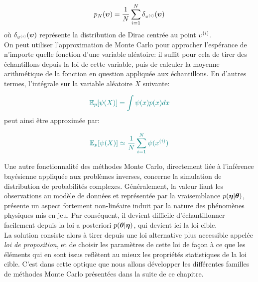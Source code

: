 \begin{equation}
p_N({\bm{\upsilon}}) = \dfrac{1}{N} \sum\limits_{i=1}^N\delta_{{\upsilon}^{(i)}}({\bm{\upsilon}})
\label{eq_approximation_MC}
\end{equation}
où $\delta_{{\upsilon}^{(i)}}({\bm{\upsilon}})$ représente la distribution de Dirac centrée au point ${\upsilon}^{(i)}$. \\

On peut utiliser l'approximation de Monte Carlo pour approcher l'espérance de n'importe quelle fonction d'une variable aléatoire: il suffit pour cela de tirer des échantillons depuis la loi de cette variable, puis de calculer la moyenne arithmétique de la fonction en question appliquée aux échantillons. En d'autres termes, l'intégrale sur la variable aléatoire $X$ suivante:

\begin{equation}
\NdFS{
\mathbb{E}_p [\psi(X)] = \int \psi(x) p(x)dx
\label{eq_integrale_MC_intractable}
}
\end{equation}
peut ainsi être approximée par:

\begin{equation}
\NdFS{
\mathbb{E}_p[\psi(X)] \simeq \dfrac{1}{N}\sum\limits_{i=1}^N \psi(x^{(i)})
\label{eq_integrale_MC_approximation}
}
\end{equation}

Une autre fonctionnalité des méthodes Monte Carlo, directement liée à l'inférence bayésienne appliquée aux problèmes inverses, concerne la simulation de distribution de probabilités complexes. Généralement, la valeur liant les observations au modèle de données et représentée par la vraisemblance $p({\bm{\eta}} |{\bm{\theta}})$, présente un aspect fortement non-linéaire induit par la nature des phénomènes physiques mis en jeu. Par conséquent, il devient difficile d'échantillonner facilement depuis la loi a posteriori ${p({\bm{\theta}} | {\bm{\eta}})}$, qui devient ici la loi cible.\\

La solution consiste alors à tirer depuis une loi alternative plus accessible appelée \textit{loi de proposition}, et de choisir les paramètres de cette loi de façon à ce que les éléments qui en sont issus reflètent au mieux les propriétés statistiques de la loi cible. C'est dans cette optique que nous allons développer les différentes familles de méthodes Monte Carlo présentées dans la suite de ce chapitre.\\


